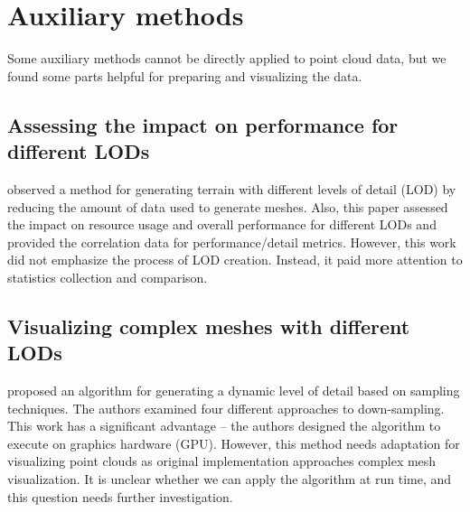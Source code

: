 \section{Auxiliary methods}

Some auxiliary methods cannot be directly applied to point cloud data, but we found some parts helpful for preparing and visualizing the data.

\subsection{Assessing the impact on performance for different LODs}

\textcite{Minarno2020} observed a method for generating terrain with different levels of detail (LOD) by reducing the amount of data used to generate meshes. Also, this paper assessed the impact on resource usage and overall performance for different LODs and provided the correlation data for performance/detail metrics. However, this work did not emphasize the process of LOD creation. Instead, it paid more attention to statistics collection and comparison.

\subsection{Visualizing complex meshes with different LODs}

\textcite{Callahan2005} proposed an algorithm for generating a dynamic level of detail based on sampling techniques. The authors examined four different approaches to down-sampling. This work has a significant advantage – the authors designed the algorithm to execute on graphics hardware (GPU). However, this method needs adaptation for visualizing point clouds as original implementation approaches complex mesh visualization. It is unclear whether we can apply the algorithm at run time, and this question needs further investigation.
